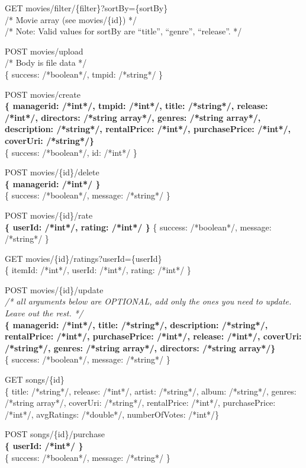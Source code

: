 GET  movies/filter/\{filter\}?sortBy=\{sortBy\} \\
/* Movie array (see movies/\{id\}) */ \\
/* Note: Valid values for sortBy are “title”, “genre”, “release”. */

POST movies/upload \\
/* Body is file data */ \\
\{ success: /*boolean*/, tmpid: /*string*/ \}

POST movies/create \\
\textbf{\{ managerid: /*int*/, tmpid: /*int*/, title: /*string*/, release: /*int*/, directors: /*string array*/, 
genres: /*string array*/, description: /*string*/, rentalPrice: /*int*/, purchasePrice: /*int*/, coverUri: /*string*/\}} \\
\{ success: /*boolean*/, id: /*int*/ \}

POST movies/\{id\}/delete \\
\textbf{\{ managerid: /*int*/ \}} \\
\{ success: /*boolean*/, message: /*string*/ \}

POST movies/\{id\}/rate \\
\textbf{\{ userId: /*int*/, rating: /*int*/ \}}
\{ success: /*boolean*/, message: /*string*/ \}

GET movies/\{id\}/ratings?userId=\{userId\} \\
\{ itemId: /*int*/, userId: /*int*/, rating: /*int*/ \}

POST movies/\{id\}/update \\
\emph{/* all arguments below are OPTIONAL, add only the ones you need to update. Leave out the rest. */} \\
\textbf{\{ managerid: /*int*/, title: /*string*/, description: /*string*/, rentalPrice: /*int*/, purchasePrice: /*int*/, 
release: /*int*/, coverUri: /*string*/, genres: /*string array*/, directors: /*string array*/\}} \\
\{ success: /*boolean*/, message: /*string*/ \}

GET  songs/\{id\} \\
\{ title: /*string*/, release: /*int*/, artist: /*string*/, album: /*string*/, genres: /*string array*/, coverUri: /*string*/, rentalPrice: /*int*/, purchasePrice: /*int*/, avgRatings: /*double*/, numberOfVotes: /*int*/\}

POST songs/\{id\}/purchase \\
\textbf{\{ userId: /*int*/ \}} \\
\{ success: /*boolean*/, message: /*string*/ \}

